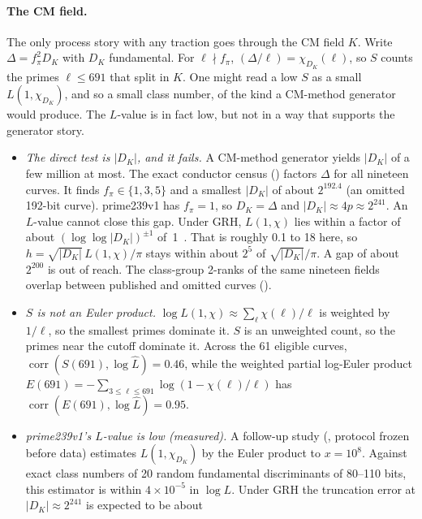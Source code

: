 \documentclass[11pt,a4paper]{article}
\theoremstyle{plain}
\newcommand{\Lhat}{\hat{L}}
\begin{document}
\paragraph{The CM field.} The only process story with any traction goes
through the CM field $K$. Write $\Delta = f_\pi^2 D_K$ with $D_K$ fundamental.
For $\ell \nmid f_\pi$, $(\Delta/\ell) = \chi_{D_K}(\ell)$, so $S$ counts the
primes $\ell \le 691$ that split in $K$. One might read a low $S$ as a small
$L(1, \chi_{D_K})$, and so a small class number, of the kind a CM-method
generator would produce. The $L$-value is in fact low, but not in a way that
supports the generator story.
\begin{itemize}
\item \emph{The direct test is $|D_K|$, and it fails.} A CM-method generator
  yields $|D_K|$ of a few million at most. The exact conductor census
  () factors
  $\Delta$ for all nineteen curves. It finds $f_\pi \in \{1, 3, 5\}$ and a
  smallest $|D_K|$ of about $2^{192.4}$ (an omitted 192-bit curve).
  prime239v1 has $f_\pi = 1$, so $D_K = \Delta$ and
  $|D_K| \approx 4p \approx 2^{241}$. An $L$-value cannot close this gap.
  Under GRH, $L(1,\chi)$ lies within a factor of about
  $(\log\log|D_K|)^{\pm 1}$ of~1~\cite{littlewood1928}. That is roughly 0.1 to
  18 here, so $h = \sqrt{|D_K|}\,L(1,\chi)/\pi$ stays within about $2^5$ of
  $\sqrt{|D_K|}/\pi$. A gap of about $2^{200}$ is out of reach. The
  class-group 2-ranks of the same nineteen fields overlap between published
  and omitted curves ().
\item \emph{$S$ is not an Euler product.}
  $\log L(1,\chi) \approx \sum_\ell \chi(\ell)/\ell$ is weighted by $1/\ell$,
  so the smallest primes dominate it. $S$ is an unweighted count, so the primes
  near the cutoff dominate it. Across the 61 eligible curves,
  $\operatorname{corr}(S(691), \log \Lhat) = 0.46$, while the weighted partial
  log-Euler product $E(691) = -\sum_{3 \le \ell \le 691} \log(1 - \chi(\ell)/\ell)$
  has $\operatorname{corr}(E(691), \log \Lhat) = 0.95$.
\item \emph{prime239v1's $L$-value is low (measured).} A follow-up study
  (, protocol frozen before data)
  estimates $L(1, \chi_{D_K})$ by the Euler product to $x = 10^8$. Against
  exact class numbers of 20 random fundamental discriminants of 80--110 bits,
  this estimator is within $4 \times 10^{-5}$ in $\log L$. Under GRH the
  truncation error at $|D_K| \approx 2^{241}$ is expected to be about

\end{itemize}
\end{document}
